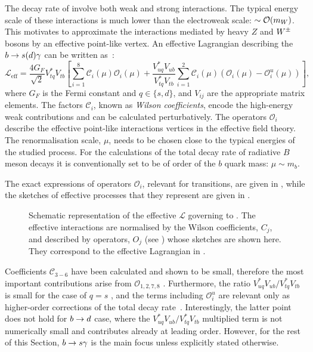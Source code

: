 The decay rate of \BtoXsdgamma involve both weak and strong interactions.
The typical energy scale of these interactions is much lower than the electroweak scale: $\sim{\ensuremath{\cal O}}(m_W)$.
This motivates to approximate the interactions mediated by heavy $Z$ and $W^\pm$ bosons by an effective point-like vertex.
An effective Lagrangian describing the $b\rightarrow s(d)\gamma$ can be written as~\cite{Kaminski:2012eb,Misiak:2015xwa}:
\begin{equation}\label{eq:effective_lagrangian}
    \mathcal{L}_{\mathrm{eff}} = \frac{4G_F}{\sqrt{2}}V_{tq}^*V_{tb}\left[\sum^{8}_{i=1}\mathcal{C}_i(\mu)\mathcal{O}_i(\mu)
                                                + \frac{V^*_{uq}V_{ub}}{V^*_{tq}V_{tb}}\sum^{2}_{i=1}\mathcal{C}_i(\mu)(\mathcal{O}_i(\mu)-\mathcal{O}_i^u(\mu))\right],
\end{equation}
where $G_F$ is the Fermi constant and $q\in\{s,d\}$, and $V_{ij}$ are the appropriate \CKM matrix elements.
The factors $\mathcal{C}_i$, known as \textit{Wilson coefficients}, encode the high-energy weak contributions and can be calculated perturbatively.
The operators $\mathcal{O}_i$ describe the effective point-like interactions vertices in the effective field theory.
The renormalisation scale, $\mu$, needs to be chosen close to the typical energies of the studied process.
For the calculations of the total decay rate of radiative $B$ meson decays it is conventionally set to be of order of the $b$ quark mass: $\mu\sim m_b$.

The exact expressions of operators $\mathcal{O}_i$, relevant for \btosgamma transitions, are given in , while the sketches of effective processes that they represent are given in .
\begin{figure}[htbp!]
    
\caption{\label{fig:b_to_s_gamma_effective}
Schematic representation of the \SM effective $\mathcal{L}$ governing to \BtoXsgamma. 
The effective interactions are normalised by the Wilson coefficients, $C_j$, and described by operators, $O_j$ (see ) whose sketches are shown here.
They correspond to the effective Lagrangian in .
}
\end{figure}
Coefficients $\mathcal{C}_{3-6}$ have been calculated and shown to be small, therefore the most important contributions arise from $\mathcal{O}_{1,2,7,8}$ \cite{Chetyrkin:1996vx,Misiak:2020vlo}.
Furthermore, the ratio $V^*_{uq}V_{ub}/V^*_{tq}V_{tb}$ is small for the case of $q=s$ \cite{Charles:2015gya}, and the terms including $\mathcal{O}^u_i$ are relevant only as higher-order corrections of the total decay rate~\cite{Misiak:2015xwa}.
Interestingly, the latter point does not hold for $b\rightarrow d$ case, where the $V^*_{uq}V_{ub}/V^*_{tq}V_{tb}$ multiplied term is not numerically small and contributes already at leading order.
However, for the rest of this Section, $b\rightarrow s\gamma$ is the main focus unless explicitly stated otherwise.

